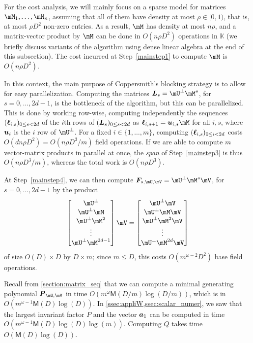 \documentclass[12pt]{article}
\newcommand{\mat}[1]{\bm{\MakeUppercase{#1}}} %
\newcommand{\row}[1]{\bm{\MakeLowercase{#1}}} %
\newcommand{\seqelt}[1]{\bm{F}_{#1}} %
\newcommand{\sqfree}{Q}
\newcommand{\density}{\rho}
\def\M {\ensuremath{\mathsf{M}}}
\def\K{\mathbb{K}}
\def\K {\ensuremath{\mathbb{K}}}
\begin{document}
For the cost analysis, we will mainly focus on a sparse model for
matrices $\mM_1,\dots,\mM_n$, assuming that all of them have density
at most $\density \in [0,1)$, that is, at most $\density D^2$ non-zero entries.  
As a result, $\mM$ has density at most $n\density$, and a matrix-vector product
by $\mM$ can be done in $O(n\density D^2)$ operations in $\K$ (we briefly
discuss variants of the algorithm using dense linear algebra at the
end of this subsection). The cost incurred at Step~\ref{mainstep1}
to compute $\mM$ is $O(n\density D^2)$.

In this context, the main purpose of Coppersmith's blocking strategy
is to allow for easy parallelization. Computing the matrices
$\mat{L}_s=\mU^{\perp}\mM^s$, for $s=0,\dots,2d-1$, is the bottleneck
of the algorithm, but this can be parallelized. This is done by
working row-wise, computing independently the sequences
$(\row{\ell}_{i,s})_{0 \le s < 2d}$ of the $i$th rows of
$(\mat{L}_s)_{0 \le s < 2d}$ as $\row{\ell}_{i,s+1} = \row{u}_{i,s}
\mM$ for all $i,s$, where $\row{u}_i$ is the $i$ row of $\mU^\perp$.
For a fixed $i \in \{1,\dots,m\}$, computing $(\mat{\ell}_{i,s})_{0
  \le i < 2d}$ costs $O(dn \density D^2) = O(n\density D^3/m )$ field operations. If
we are able to compute $m$ vector-matrix products in parallel at once,
the {\em span} of Step~\ref{mainstep3} is thus $O(n\density D^3/m)$, whereas
the total work is $O(n\density D^3)$.

At Step~\ref{mainstep4}, we can then compute $\seqelt{s,\mU,\mV}=\mU^{\perp}\mM^s\mV$, for $s=0,\dots,2d-1$ by the
product
$$
\begin{bmatrix}
\mU^{\perp}\\
\mU^{\perp} \mM\\
\mU^{\perp} \mM^2\\
\vdots\\
\mU^{\perp} \mM^{2d-1}\\
\end{bmatrix} \mV
= 
\begin{bmatrix}
\mU^{\perp} \mV\\
\mU^{\perp} \mM \mV\\
\mU^{\perp} \mM^2 \mV\\
\vdots \\
\mU^{\perp} \mM^{2d} \mV\\
\end{bmatrix}
$$
of size $O(D) \times D$ by $D \times m$; since $m \le D$, this  costs $O(m^{\omega-2}D^2)$
base field operations.

Recall from \cref{section:matrix_seq} that we can compute a minimal
generating polynomial $\mat{P}_{\mU,\mV}$ in time $O(m^{\omega}
\M(D/m) \log(D/m))$, which is in $O(m^{\omega-1} \M(D) \log(D))$.  In
\cref{ssec:appliW,ssec:scalar_numer}, we saw that the
largest invariant factor $P$ and the vector $\row{a}_1$ can be
computed in time $O(m^{\omega-1} \M(D) \log(D) \log(m))$.  Computing $\sqfree$
takes time $O(\M(D) \log(D))$.
\end{document}

